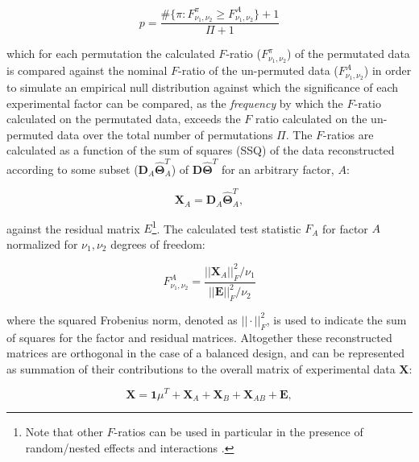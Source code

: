 \documentclass[preprint,12pt]{elsarticle}
\begin{document}
\begin{equation}\label{eq:perm1}
p = \frac{\#\{\pi:F^\pi_{\nu_1,\nu_2} \geq F^{A}_{\nu_1,\nu_2}\} + 1}{\Pi+1}
\end{equation}

\noindent which for each permutation the calculated $F$-ratio ($F^\pi_{\nu_1,\nu_2}$) of the permutated data is compared against the nominal $F$-ratio of the un-permuted data ($F^{A}_{\nu_1,\nu_2}$) in order to simulate an empirical null distribution against which the significance of each experimental factor can be compared, as the \textit{frequency} by which the $F$-ratio calculated on the permutated data, exceeds the $F$ ratio calculated on the un-permuted data over the total number of permutations $\Pi$. The $F$-ratios are calculated as a function of the sum of squares (SSQ) of the data reconstructed according to some subset ($\mathbf{D}_A\mathbf{\hat{\Theta}}_A^T$) of $\mathbf{D}\mathbf{\hat{\Theta}}^T$ for an arbitrary factor, $A$:

\begin{equation}\label{eq:rec}
    \mathbf{X}_A = \mathbf{D}_A\mathbf{\hat{\Theta}}^T_A,
\end{equation}

\noindent against the residual matrix $E$\footnote{Note that other $F$-ratios can be used in particular in the presence of random/nested effects and interactions \cite{anderson2014permutational}.}. The calculated test statistic $F_A$ for factor $A$ normalized for $\nu_1, \nu_2$ degrees of freedom:

 \begin{equation}\label{eq:sig_test}
    F^A_{\nu_1,\nu_2} = \frac{||\mathbf{X}_A||_F^2/\nu_1}{||\mathbf{E}||^2_F/\nu_2}
\end{equation}

\noindent where the squared Frobenius norm, denoted as $||\cdot||^2_F$, is used to indicate the sum of squares for the factor and residual matrices. Altogether these reconstructed matrices are orthogonal in the case of a balanced design, and can be represented as summation of their contributions to the overall matrix of experimental data $\mathbf{X}$:

\begin{equation}
    \mathbf{X} = \mathbf{1}\mu^T + \mathbf{X}_A + \mathbf{X}_B + \mathbf{X}_{AB} + \mathbf{E},
\end{equation}
\end{document}
